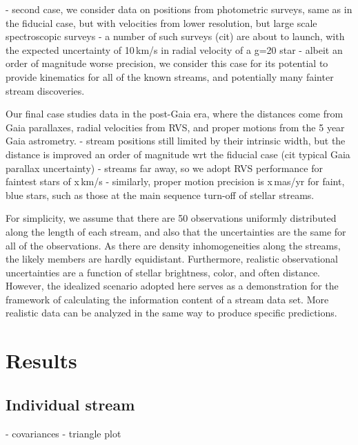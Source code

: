 \documentclass[modern]{aastex61}
\begin{document}
- second case, we consider data on positions from photometric surveys, same as in the fiducial case, but with velocities from lower resolution, but large scale spectroscopic surveys
- a number of such surveys (cit) are about to launch, with the expected uncertainty of 10\,km/s in radial velocity of a g=20 star
- albeit an order of magnitude worse precision, we consider this case for its potential to provide kinematics for all of the known streams, and potentially many fainter stream discoveries. 

Our final case studies data in the post-Gaia era, where the distances come from Gaia parallaxes, radial velocities from RVS, and proper motions from the 5 year Gaia astrometry.
- stream positions still limited by their intrinsic width, but the distance is improved an order of magnitude wrt the fiducial case (cit typical Gaia parallax uncertainty)
- streams far away, so we adopt RVS performance for faintest stars of x\,km/s
- similarly, proper motion precision is x\,mas/yr for faint, blue stars, such as those at the main sequence turn-off of stellar streams.

For simplicity, we assume that there are 50 observations uniformly distributed along the length of each stream, and also that the uncertainties are the same for all of the observations.
As there are density inhomogeneities along the streams, the likely members are hardly equidistant.
Furthermore, realistic observational uncertainties are a function of stellar brightness, color, and often distance.
However, the idealized scenario adopted here serves as a demonstration for the framework of calculating the information content of a stream data set.
More realistic data can be analyzed in the same way to produce specific predictions.

\section{Results}

\subsection{Individual stream}
- covariances
- triangle plot
\end{document}
